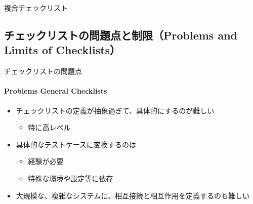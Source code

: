 \begin{frame}[shrink=5]{複合チェックリスト}
\end{frame}

\subsection{チェックリストの問題点と制限（Problems and Limits of Checklists）}
\begin{frame}{チェックリストの問題点}
\framesubtitle{Problems General Checklists}

\begin{itemize}
\item チェックリストの定義が抽象過ぎて、具体的にするのが難しい
    \begin{itemize}
    \item 特に高レベル
    \end{itemize}
\item 具体的なテストケースに変換するのは
    \begin{itemize}
    \item 経験が必要
    \item 特殊な環境や設定等に依存
    \end{itemize}
\item 大規模な、複雑なシステムに、相互接続と相互作用を定義するのも難しい 
\end{itemize}

\end{frame}
